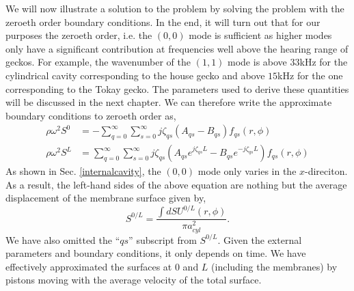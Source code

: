 We will now illustrate a solution to the problem by solving the problem with the zeroeth order boundary conditions. 
In the end, it will turn out that for our purposes the zeroeth order, i.e. the $(0,0)$ mode is sufficient as higher modes only have a significant contribution at frequencies
well above the hearing range of geckos. For example, the wavenumber of the $(1,1)$ mode is above $33$kHz for the cylindrical cavity corresponding to the house gecko and 
above $15$kHz for the one corresponding to the Tokay gecko. The parameters used to derive these quantities will be discussed in the next chapter.
We can therefore write the approximate boundary conditions to zeroeth order as,
\begin{align}
   \rho\omega^2S^{0}&=-\displaystyle\sum^\infty_{q=0}\displaystyle\sum^\infty_{s=0}j\zeta_{qs}\left(A_{qs}-B_{qs}\right)f_{qs}(r,\phi) \label{bcfinal1}\\
   \rho\omega^2S^{L}&=\displaystyle\sum^\infty_{q=0}\displaystyle\sum^\infty_{s=0}j\zeta_{qs}\left(A_{qs}e^{j\zeta_{qs}L}-B_{qs}e^{-j\zeta_{qs}L}\right)f_{qs}(r,\phi) \label{bcfinal2}
\end{align}
As shown in Sec. \ref{internalcavity}, the $(0,0)$ mode only varies in the $x$-direciton.
As a result, the left-hand sides of
the above equation are nothing but the average displacement of the membrane surface given by,
\begin{equation}\label{averagemembranedisp}
 S^{0/L}=\frac{\int dS U^{0/L}(r,\phi)}{\pi a^2_{cyl}}.
\end{equation}
We have also omitted the ``$qs$'' subscript from $S^{0/L}$. 
Given the external parameters and boundary conditions, it only depends on time.
We have effectively approximated the surfaces at $0$ and $L$ (including the membranes) by pistons moving with the average velocity of the total surface.


